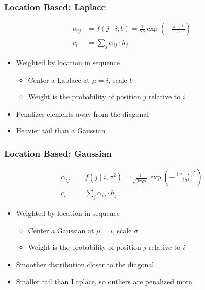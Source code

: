 \documentclass{beamer}
\begin{document}
\begin{frame}
\frametitle{Location Based: Laplace}
\begin{equation*}
  \begin{split}
  \alpha_{ij} &= f \left(j \mid i, b \right) = \frac{1}{2b} \exp \left( - \frac{\lvert j - i \rvert}{b} \right) \\
  c_i &= \sum_{j} \alpha_{ij} \cdot h_j
  \end{split}
\end{equation*}
\begin{itemize}
  \item Weighted by location in sequence
  \begin{itemize}
    \item Center a Laplace at $\mu=i$, scale $b$
    \item Weight is the probability of position $j$ relative to $i$
  \end{itemize}
  \item Penalizes elements away from the diagonal
  \item Heavier tail than a Gaussian
\end{itemize}
\end{frame}

\begin{frame}
\frametitle{Location Based: Gaussian}
\begin{equation*}
  \begin{split}
  \alpha_{ij} &= f \left(j \mid i, \sigma^2 \right) = \frac{1}{\sqrt{2\pi\sigma^2}} \exp \left( - \frac{\left( j - i \right)^2}{2\sigma^2} \right) \\
  c_i &= \sum_{j} \alpha_{ij} \cdot h_j
  \end{split}
\end{equation*}
\begin{itemize}
  \item Weighted by location in sequence
  \begin{itemize}
    \item Center a Gaussian at $\mu=i$, scale $\sigma$
    \item Weight is the probability of position $j$ relative to $i$
  \end{itemize}
  \item Smoother distribution closer to the diagonal
  \item Smaller tail than Laplace, so outliers are penalized more
\end{itemize}
\end{frame}
\end{document}
